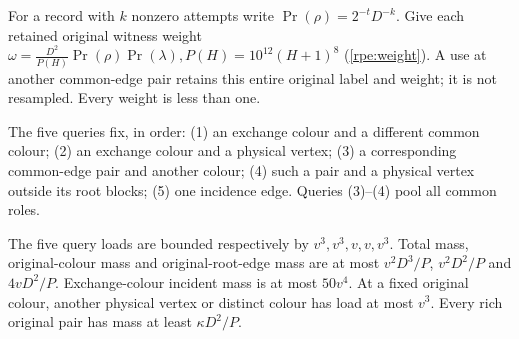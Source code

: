 For a record with $k$ nonzero attempts write $\Pr(\rho)=2^{-t}D^{-k}$. Give each retained original witness weight \label{rpe:weight}$\omega=\frac{D^2}{P(H)}\Pr(\rho)\Pr(\lambda),P(H)=10^{12}(H+1)^8$ \textup{(\ref{rpe:weight})}. A use at another common-edge pair retains this entire original label
and weight; it is not resampled. Every weight is less than one.

The five queries fix, in order: (1) an exchange colour and a different common colour; (2) an exchange colour and a physical vertex; (3) a corresponding common-edge pair and another colour; (4) such a pair and a physical vertex outside its root blocks; (5) one incidence edge. Queries (3)--(4) pool all common roles.

\begin{lemma}\label{rpe:loads}\label{ent:loads}
The five query loads are bounded respectively by $v^3,v^3,v,v,v^3$. Total mass, original-colour mass and original-root-edge mass are at most $v^2D^3/P$, $v^2D^2/P$ and $4vD^2/P$. Exchange-colour incident mass is at most $50v^4$. At a fixed original colour, another physical vertex or distinct colour has load at most $v^3$. Every rich original pair has mass at least $\kappa{}D^2/P$.
\end{lemma}
